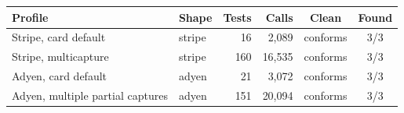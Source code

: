 \begin{tabular}{llrrcc}
\toprule
Profile & Shape & Tests & Calls & Clean & Found \\
\midrule
Stripe, card default & stripe & 16 & 2,089 & conforms & 3/3 \\
Stripe, multicapture & stripe & 160 & 16,535 & conforms & 3/3 \\
Adyen, card default & adyen & 21 & 3,072 & conforms & 3/3 \\
Adyen, multiple partial captures & adyen & 151 & 20,094 & conforms & 3/3 \\
\bottomrule
\end{tabular}
